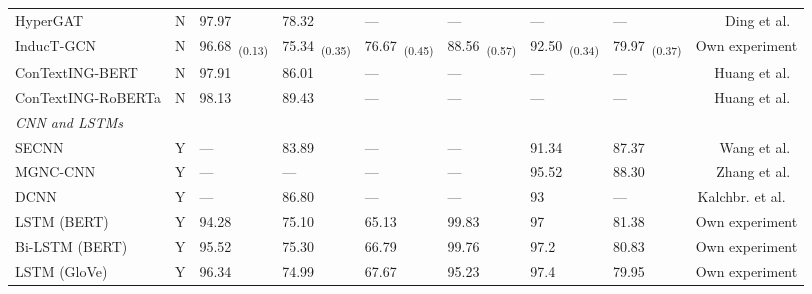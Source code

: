 \documentclass[runningheads]{llncs}
\begin{document}
\begin{table*}[!ht]
\begin{threeparttable}
{\begin{tabular}{lcllllllr}
            HyperGAT                                & N                   & 97.97            & 78.32          & ---                               & ---              & ---           & ---            & Ding et al.~\cite{ding-etal-2020-hypergat} \\
            InducT-GCN                              & N                   & 96.68~\textsubscript{(0.13)}            & 75.34~\textsubscript{(0.35)}          & 76.67~\textsubscript{(0.45)}                             & 88.56~\textsubscript{(0.57)}            & 92.50~\textsubscript{(0.34)}          & 79.97~\textsubscript{(0.37)}          & Own experiment                  \\
            ConTextING-BERT                         & N                   & 97.91            & 86.01          & ---                                & ---              & ---           & ---           & Huang et al.~\cite{huang-etal-2022-contexting}                 \\
            ConTextING-RoBERTa                      & N                   & 98.13            & 89.43          & ---                                & ---              & ---           & ---           & Huang et al.~\cite{huang-etal-2022-contexting}                 \\
            \midrule
            \textit{CNN and LSTMs} \\
            SECNN\tnote{}                        & Y                   & ---              & 83.89          & ---                               & ---              & 91.34         & 87.37          & Wang et al.~\cite{wang2021short}           \\
    MGNC-CNN & Y & --- & --- & --- & --- & 95.52 & 88.30\tnote{} & Zhang et al.~\cite{DBLP:conf/naacl/ZhangRW16} \\ 
    DCNN     & Y & --- & 86.80\tnote{} & --- & --- & 93 & --- & Kalchbr. et al.
    ~\cite{DBLP:conf/acl/KalchbrennerGB14} \\
            LSTM (BERT)                             & Y                   & 94.28            & 75.10          & 65.13                             & 99.83            & 97            & 81.38          & Own experiment                  \\
            Bi-LSTM (BERT)                          & Y                   & 95.52            & 75.30          & 66.79                             & 99.76            & 97.2          & 80.83          & Own experiment                  \\
            LSTM (GloVe)                            & Y                   & 96.34            & 74.99          & 67.67                             & 95.23            & 97.4          & 79.95          & Own experiment                  \\

\end{tabular}}
\end{threeparttable}
\end{table*}
\end{document}
